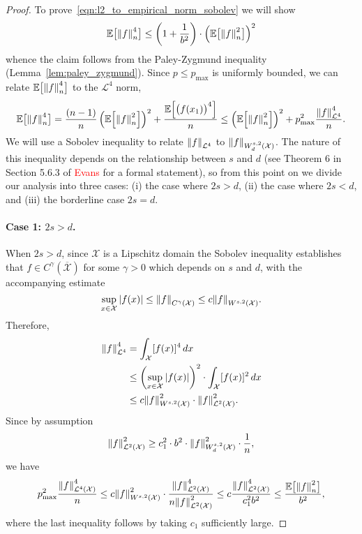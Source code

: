 \documentclass{article}
\newcommand{\1}{\mathbf{1}}
\newcommand{\Xset}{\mathcal{X}}
\newcommand{\Leb}{\mathcal{L}}
\newcommand{\Ebb}{\mathbb{E}}
\theoremstyle{alden}
\theoremstyle{aldenthm}
\theoremstyle{definition}
\theoremstyle{remark}
\begin{document}
\begin{proof}
	To prove~\eqref{eqn:l2_to_empirical_norm_sobolev} we will show
	\begin{equation*}
	\mathbb{E}\bigl[\norm{f}_n^4\bigr] \leq \left(1 + \frac{1}{b^2}\right)\cdot \left(\mathbb{E}\bigl[\norm{f}_n^2\bigr]\right)^2
	\end{equation*}
	whence the claim follows from the Paley-Zygmund inequality (Lemma~\ref{lem:paley_zygmund}). Since $p \leq p_{\max}$ is uniformly bounded, we can relate $\mathbb{E}\bigl[\norm{f}_n^4\bigr]$ to the $\Leb^4$ norm,
	\begin{equation*}
	\mathbb{E}\bigl[\norm{f}_n^4\bigr] = \frac{(n-1)}{n}\left(\mathbb{E}\Bigl[\norm{f}_n^2\Bigr]\right)^2 + \frac{\mathbb{E}\Bigl[\bigl(f(x_1)\bigr)^4\Bigr]}{n} \leq \left(\mathbb{E}\Bigl[\norm{f}_n^2\Bigr]\right)^2 + p_{\max}^2\frac{\norm{f}_{\Leb^4}^4}{n}.
	\end{equation*}
	We will use a Sobolev inequality to relate $\norm{f}_{\Leb^4}$ to $\norm{f}_{W_d^{s,2}(\Xset)}$. The nature of this inequality depends on the relationship between $s$ and $d$ (see Theorem 6 in Section 5.6.3 of \textcolor{red}{Evans} for a formal statement), so from this point on we divide our analysis into three cases: (i) the case where $2s > d$, (ii) the case where $2s < d$, and (iii) the borderline case $2s = d$.
	
	\paragraph{Case 1: $2s > d$.}
	When $2s > d$, since $\Xset$ is a Lipschitz domain the Sobolev inequality establishes that $f \in C^{\gamma}(\overline{\Xset})$ for some $\gamma > 0$ which depends on $s$ and $d$, with the accompanying estimate
	\begin{equation*}
	\sup_{x \in \Xset} \abs{f(x)} \leq \norm{f}_{C^{\gamma}(\Xset)} \leq c \norm{f}_{W^{s,2}(\Xset)}.
	\end{equation*}
	Therefore,
	\begin{align*}
	\norm{f}_{\Leb^4}^4 & = \int_{\Xset} [f(x)]^4 \,dx \\
	& \leq \left(\sup_{x \in \Xset} \abs{f(x)}\right)^2 \cdot \int_{\Xset} [f(x)]^2 \,dx \\
	& \leq c \norm{f}_{W^{s,2}(\Xset)}^2 \cdot \norm{f}_{\Leb^2(\Xset)}^2.
	\end{align*}
	Since by assumption
	\begin{equation*}
	\norm{f}_{\Leb^2(\Xset)}^2 \geq c_1^2 \cdot b^2 \cdot \norm{f}_{W_d^{s,2}(\Xset)}^2 \cdot \frac{1}{n},
	\end{equation*}
	we have
	\begin{equation*}
	p_{\max}^2\frac{\norm{f}_{\Leb^4(\Xset)}^4}{n} \leq c \norm{f}_{W^{s,2}(\Xset)}^2 \cdot \frac{\norm{f}_{\Leb^2(\Xset)}^4}{n \norm{f}_{\Leb^2(\Xset)}^2} \leq c \frac{\norm{f}_{\Leb^2(\Xset)}^4}{c_1^2 b^2} \leq \frac{\Ebb\bigl[\norm{f}_n^2\bigr]}{b^2},
	\end{equation*}
	where the last inequality follows by taking $c_1$ sufficiently large.
	

\end{proof}
\end{document}
